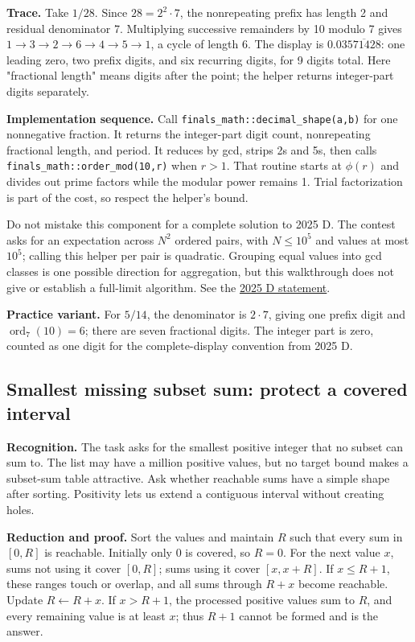 \textbf{Trace.} Take $1/28$. Since $28=2^2\cdot7$, the nonrepeating prefix has length 2 and residual denominator 7. Multiplying successive remainders by 10 modulo 7 gives $1\to3\to2\to6\to4\to5\to1$, a cycle of length 6. The display is $0.03\overline{571428}$: one leading zero, two prefix digits, and six recurring digits, for 9 digits total. Here "fractional length" means digits after the point; the helper returns integer-part digits separately.

\textbf{Implementation sequence.} Call \texttt{finals\_math::decimal\_shape(a,b)} for one nonnegative fraction. It returns the integer-part digit count, nonrepeating fractional length, and period. It reduces by gcd, strips 2s and 5s, then calls \texttt{finals\_math::order\_mod(10,r)} when $r>1$. That routine starts at $\phi(r)$ and divides out prime factors while the modular power remains 1. Trial factorization is part of the cost, so respect the helper's bound.

Do not mistake this component for a complete solution to 2025 D. The contest asks for an expectation across $N^2$ ordered pairs, with $N\le10^5$ and values at most $10^5$; calling this helper per pair is quadratic. Grouping equal values into gcd classes is one possible direction for aggregation, but this walkthrough does not give or establish a full-limit algorithm. See the \href{https://scorelatam.naquadah.com.br/latam-2025/contest.pdf}{2025 D statement}.

\textbf{Practice variant.} For $5/14$, the denominator is $2\cdot7$, giving one prefix digit and $\operatorname{ord}_7(10)=6$; there are seven fractional digits. The integer part is zero, counted as one digit for the complete-display convention from 2025 D.

\subsection{Smallest missing subset sum: protect a covered interval}\label{case:missing}

\textbf{Recognition.} The task asks for the smallest positive integer that no subset can sum to. The list may have a million positive values, but no target bound makes a subset-sum table attractive. Ask whether reachable sums have a simple shape after sorting. Positivity lets us extend a contiguous interval without creating holes.

\textbf{Reduction and proof.} Sort the values and maintain $R$ such that every sum in $[0,R]$ is reachable. Initially only 0 is covered, so $R=0$. For the next value $x$, sums not using it cover $[0,R]$; sums using it cover $[x,x+R]$. If $x\le R+1$, these ranges touch or overlap, and all sums through $R+x$ become reachable. Update $R\gets R+x$. If $x>R+1$, the processed positive values sum to $R$, and every remaining value is at least $x$; thus $R+1$ cannot be formed and is the answer.

